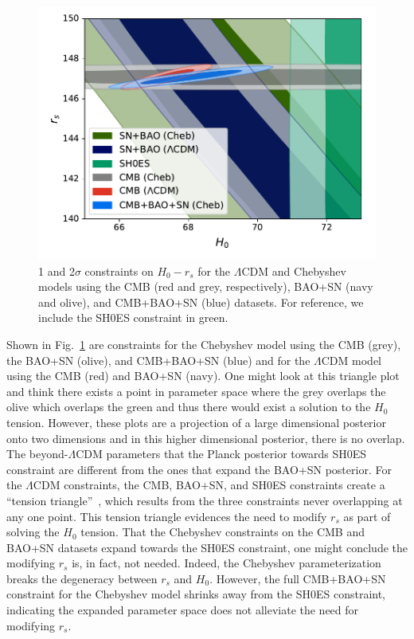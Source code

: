 \documentclass[
 reprint,
 amsmath,amssymb,
 aps,
]{revtex4-2}
\begin{document}
\begin{figure}
    \centering
    \includegraphics[width=\columnwidth]{H0rstest.pdf}
    \caption{1 and 2$\sigma$ constraints on $H_0-r_s$ for the $\Lambda$CDM and Chebyshev models using the CMB (red and grey, respectively), BAO+SN (navy and olive), and CMB+BAO+SN (blue) datasets. For reference, we include the SH0ES constraint in green.}
    \label{fig:H0rs}
\end{figure}


Shown in Fig.~\ref{fig:H0rs} are constraints for the Chebyshev model using the CMB (grey), the BAO+SN (olive), and CMB+BAO+SN (blue) and for the $\Lambda$CDM model using the CMB (red) and BAO+SN (navy).
One might look at this triangle plot and think there exists a point in parameter space where the grey overlaps the olive which overlaps the green and thus there would exist a solution to the $H_0$ tension.  However, these plots are a projection of a large dimensional posterior onto two dimensions and in this higher dimensional posterior, there is no overlap.  The beyond-$\Lambda$CDM parameters that the Planck posterior towards SH0ES constraint are different from the ones that expand the BAO+SN posterior.  For the $\Lambda$CDM constraints, the CMB, BAO+SN, and SH0ES constraints create a ``tension triangle''~\cite{2016JCAP...10..019B}, which results from the three constraints never overlapping at any one point. This tension triangle evidences the need to modify $r_s$ as part of solving the $H_0$ tension. That the Chebyshev constraints on the CMB and BAO+SN datasets expand towards the SH0ES constraint, one might conclude the modifying $r_s$ is, in fact, not needed. Indeed, the Chebyshev parameterization breaks the degeneracy between $r_s$ and $H_0$.  However, the full CMB+BAO+SN constraint for the Chebyshev model shrinks away from the SH0ES constraint, indicating the expanded parameter space does not alleviate the need for modifying $r_s$.
\end{document}
